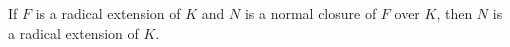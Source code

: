 If $F$ is a radical extension of $K$ and $N$ is a normal closure of $F$ over $K$, then $N$ is a radical extension of $K$.
